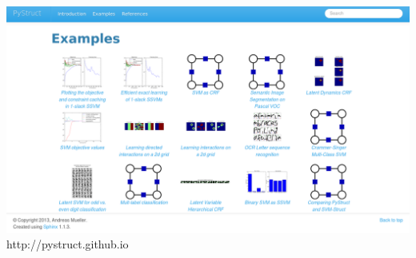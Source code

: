 \documentclass[final,ignorenonframetext,compress]{beamer}
\begin{document}
    \begin{frame}
        \begin{center}
            \includegraphics[width=\linewidth]{images/example_gallery}\\
            http://pystruct.github.io
        \end{center}
    \end{frame}






\end{document}
